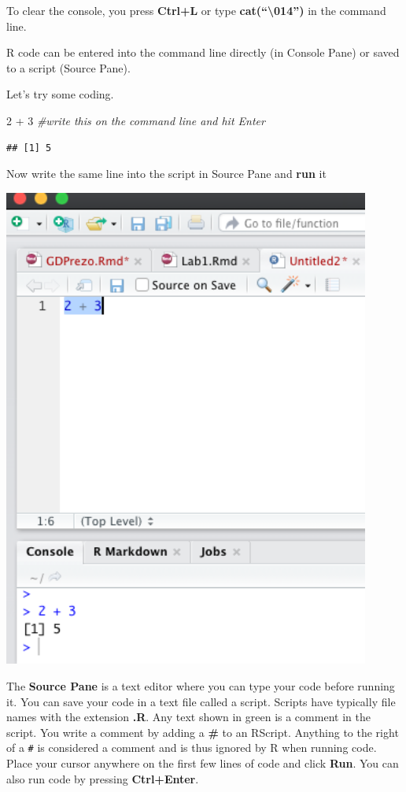 \documentclass[
]{book}
\newenvironment{Shaded}{\begin{snugshade}}{\end{snugshade}}
\newcommand{\CommentTok}[1]{\textcolor[rgb]{0.56,0.35,0.01}{\textit{#1}}}
\newcommand{\DecValTok}[1]{\textcolor[rgb]{0.00,0.00,0.81}{#1}}
\newcommand{\SpecialCharTok}[1]{\textcolor[rgb]{0.00,0.00,0.00}{#1}}
\theoremstyle{definition}
\theoremstyle{definition}
\theoremstyle{definition}
\theoremstyle{definition}
\theoremstyle{remark}
\begin{document}
To clear the console, you press \textbf{Ctrl+L} or type \textbf{cat(``\textbackslash014'')} in the command line.

R code can be entered into the command line directly (in Console Pane) or saved to a script (Source Pane).

Let's try some coding.

\begin{Shaded}
\begin{Highlighting}[]
\DecValTok{2} \SpecialCharTok{+} \DecValTok{3} \CommentTok{\#write this on the command line and hit Enter}
\end{Highlighting}
\end{Shaded}

\begin{verbatim}
## [1] 5
\end{verbatim}

Now write the same line into the script in Source Pane and \textbf{run} it

\includegraphics[width=4.75in]{png/Rstudio5}

The \textbf{Source Pane} is a text editor where you can type your code before running it. You can save your code in a text file called a script. Scripts have typically file names with the extension \textbf{.R}. Any text shown in green is a comment in the script. You write a comment by adding a \textbf{\#} to an RScript. Anything to the right of a \texttt{\#} is considered a comment and is thus ignored by R when running code. Place your cursor anywhere on the first few lines of code and click \textbf{Run}. You can also run code by pressing \textbf{Ctrl+Enter}.
\end{document}
